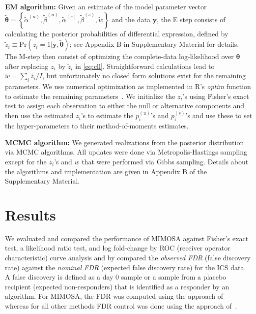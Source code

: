 \documentclass[12pt,oupdraft]{biostatistics}
\begin{document}
\noindent\textbf{EM algorithm:} Given an estimate of the model parameter vector $\tilde{\boldsymbol{\theta}}=\left\{\tilde{\alpha}^{(u)},\tilde{\beta}^{(u)},\tilde{\alpha}^{(s)},\tilde{\beta}^{(s)},\tilde{w}\right\}$ and the data $\mathbf{y}$, the E step consists of calculating the posterior probabilities of differential expression, defined by
$\tilde z_{i} \equiv \mathrm{Pr}(z_i=1|\mathbf{y},\tilde{\boldsymbol{\theta}})$; see Appendix B in Supplementary Material for details.
The M-step then consist of optimizing the complete-data log-likelihood over $\boldsymbol{\theta}$ after replacing $z_i$ by $\tilde{z}_{i}$ in \eqref{eq:cll}. Straightforward calculations lead to
$\tilde w = \sum_i{\tilde{z_i}}/I$, but unfortunately no closed form solutions exist for the remaining parameters. We use numerical optimization as implemented in R's \textit{optim} function to estimate the remaining parameters~\citep{Ihaka:1996ud}.  We initialize the $z_{i}$'s using Fisher's exact test to assign each observation to either the null or alternative components and then use the estimated $z_i$'s to estimate the $p^{(u)}_{i}$'s and $p^{(s)}_{i}$'s and use these to set the hyper-parameters to their method-of-moments estimates.

\noindent\textbf{MCMC algorithm:} We generated realizations from the posterior distribution via MCMC algorithms. All updates were done via Metropolis-Hastings sampling except for the $z_i$'s and $w$ that were performed via Gibbs sampling.
Details about the algorithms and implementation are given in Appendix B of the Supplementary Material. 

\section{Results}
\label{s:results}
We evaluated and compared the performance of MIMOSA against Fisher's exact test, a likelihood ratio test, and log fold-change by ROC (receiver operator characteristic) curve analysis and by compared the \textit{observed FDR} (false discovery rate) against the \textit{nominal FDR} (expected false discovery rate) for the ICS data.  A false discovery is defined as a day 0 sample or a sample from a placebo recipient (expected non-responders) that is identified as a responder by an algorithm. For MIMOSA, the FDR was computed using the approach of~\citet{Newton2004} whereas for all other methods FDR control was done using the approach of~\citet{Benjamini1995}.
\end{document}
